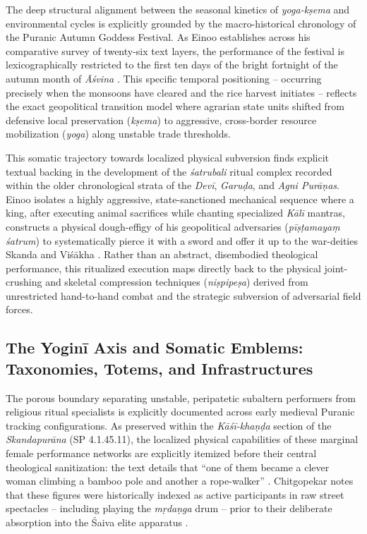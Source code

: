 \documentclass[11pt,twoside,letterpaper]{article}
\begin{document}
The deep structural alignment between the seasonal kinetics of \textit{yoga-kṣema} and environmental cycles is explicitly grounded by the macro-historical chronology of the Puranic Autumn Goddess Festival. As Einoo establishes across his comparative survey of twenty-six text layers, the performance of the festival is lexicographically restricted to the first ten days of the bright fortnight of the autumn month of \textit{Āśvina} \citep{Einoo1999}. This specific temporal positioning -- occurring precisely when the monsoons have cleared and the rice harvest initiates -- reflects the exact geopolitical transition model where agrarian state units shifted from defensive local preservation (\textit{kṣema}) to aggressive, cross-border resource mobilization (\textit{yoga}) along unstable trade thresholds.

This somatic trajectory towards localized physical subversion finds explicit textual backing in the development of the \textit{śatrubali} ritual complex recorded within the older chronological strata of the \textit{Devī}, \textit{Garuḍa}, and \textit{Agni Purāṇas}. Einoo isolates a highly aggressive, state-sanctioned mechanical sequence where a king, after executing animal sacrifices while chanting specialized \textit{Kālī} mantras, constructs a physical dough-effigy of his geopolitical adversaries (\textit{pīṣṭamayaṃ śatrum}) to systematically pierce it with a sword and offer it up to the war-deities Skanda and Viśākha \citep{Einoo1999}. Rather than an abstract, disembodied theological performance, this ritualized execution maps directly back to the physical joint-crushing and skeletal compression techniques (\textit{niṣpipeṣa}) derived from unrestricted hand-to-hand combat and the strategic subversion of adversarial field forces.

\subsection{The Yoginī Axis and Somatic Emblems: Taxonomies, Totems, and Infrastructures}
The porous boundary separating unstable, peripatetic subaltern performers from religious ritual specialists is explicitly documented across early medieval Puranic tracking configurations. As preserved within the \textit{Kāśī-khaṇḍa} section of the \textit{Skandapurāna} (SP 4.1.45.11), the localized physical capabilities of these marginal female performance networks are explicitly itemized before their central theological sanitization: the text details that “one of them became a clever woman climbing a bamboo pole and another a rope-walker” \citep{Shastri1991}. Chitgopekar notes that these figures were historically indexed as active participants in raw street spectacles -- including playing the \textit{ mṛdaṇga} drum -- prior to their deliberate absorption into the Śaiva elite apparatus \citep{Chitgopekar2002}.
\end{document}
